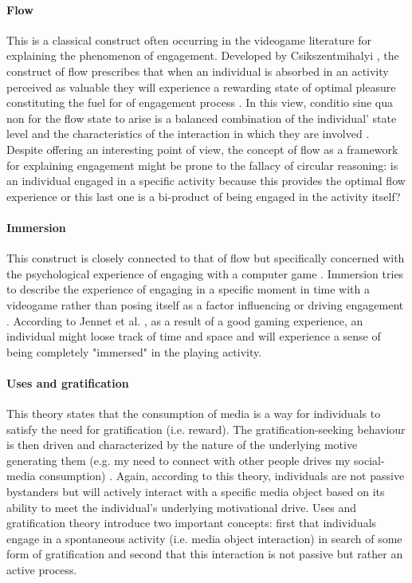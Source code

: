 \paragraph*{Flow} This is a classical construct often occurring in the videogame literature for explaining the phenomenon of engagement. Developed by Csikszentmihalyi \cite{csikszentmihalyi2014toward}, the construct of flow prescribes that when an individual is absorbed in an activity perceived as valuable they will experience a rewarding state of optimal pleasure constituting the fuel for of engagement process \cite{boyle2012engagement}. In this view, conditio sine qua non for the flow state to arise is a balanced combination of the individual’ state level and the characteristics of the interaction in which they are involved \cite{boyle2012engagement,csikszentmihalyi2014toward}. Despite offering an interesting point of view, the concept of flow as a framework for explaining engagement might be prone to the fallacy of circular reasoning: is an individual engaged in a specific activity because this provides the optimal flow experience or this last one is a bi-product of being engaged in the activity itself? 

\paragraph*{Immersion} This construct is closely connected to that of flow but specifically concerned with the psychological experience of engaging with a computer game \cite{jennett2008measuring}. Immersion tries to describe the experience of engaging in a specific moment in time with a videogame  rather than posing itself as a factor influencing or driving engagement \cite{jennett2008measuring}. According to Jennet et al. \cite{jennett2008measuring}, as a result of a good gaming experience, an individual might loose track of time and space and will experience a sense of being completely "immersed" in the playing activity.

\paragraph*{Uses and gratification} This theory states that the consumption of media is a way for individuals to satisfy the need for gratification (i.e. reward). The gratification-seeking behaviour is then driven and characterized by the nature of the underlying motive generating them (e.g. my need to connect with other people drives my social-media consumption) \cite{lucas2004sex}. Again, according to this theory, individuals are not passive bystanders but will actively interact with a specific media object based on its ability to meet the individual's underlying motivational drive. Uses and gratification theory introduce two important concepts: first that individuals engage in a spontaneous activity (i.e. media object interaction) in search of some form of gratification and second that this interaction is not passive but rather an active process.

